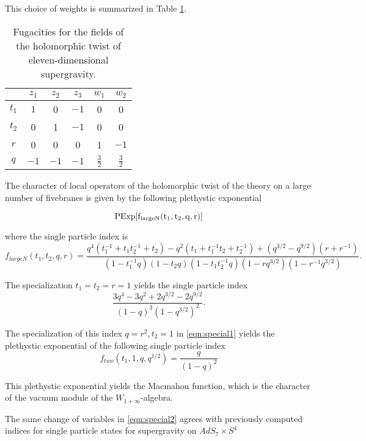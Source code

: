 This choice of weights is summarized in Table \ref{tbl:sugra}.

\begin{table}
\begin{center}
\begin{tabular}{c c c c c c}
  & $z_{1}$ & $z_{2}$ & $z_{3}$ & $w_{1}$ & $w_{2}$ \\
  \hline
  $t_{1}$ & $1$ & 0 & $-1$ & 0 & 0 \\
  $t_{2}$ & 0 & 1 & $-1$ & 0 & 0 \\
  $r$ & 0 & 0 & 0 & 1 & $-1$ \\
  $q$ & $-1$ & $-1$ & $-1$ & $\frac{3}{2}$ & $\frac{3}{2}$
\end{tabular}
\caption{Fugacities for the fields of the holomorphic twist of eleven-dimensional supergravity.}
\label{tbl:sugra}
\end{center}
\end{table}

\parsec


\begin{prop}
  The character of local operators of the holomorphic twist of the theory on a large number of fivebranes is given by the following plethystic exponential

  \[ \rm PExp [f_{large N}(t_{1}, t_{2}, q, r)] \]

  where the single particle index is \[f_{large N}(t_{1}, t_{2}, q, r) = \frac{q^4(t_1^{-1}+t_1t_2^{-1}+t_2)-q^2(t_1+t_1^{-1}t_2+t_2^{-1})+(q^{3/2}-q^{9/2})(r+r^{-1})}{(1-t_{1}^{-1}q)(1-t_{2}q)(1-t_{1}t_{2}^{-1}q)(1-rq^{3/2})(1-r^{-1}q^{3/2})}.\]
\end{prop}

\parsec

The specialization $t_1=t_2=r=1$ yields the single particle index
\[
\frac{3 q^4 - 3 q^2 + 2 q^{3/2} - 2 q^{9/2}}{(1-q)^3 (1-q^{3/2})^2} .
\]

\parsec 
The specialization of this index $q=r^2, t_2=1$ in \eqref{eqn:special1} yields the plethystic exponential of the following single particle index
\[
f_{two}(t_1, 1, q, q^{1/2}) = \frac{q}{(1-q)^2}
\]

This plethystic exponential yields the Macmahon function, which is the character of the vacuum module of the $W_{1+\infty}$-algebra.

\parsec The same change of variables in \eqref{eqn:special2} agrees with previously computed indices for single particle states for supergravity on $AdS_{7}\times S^{4}$ 

%
